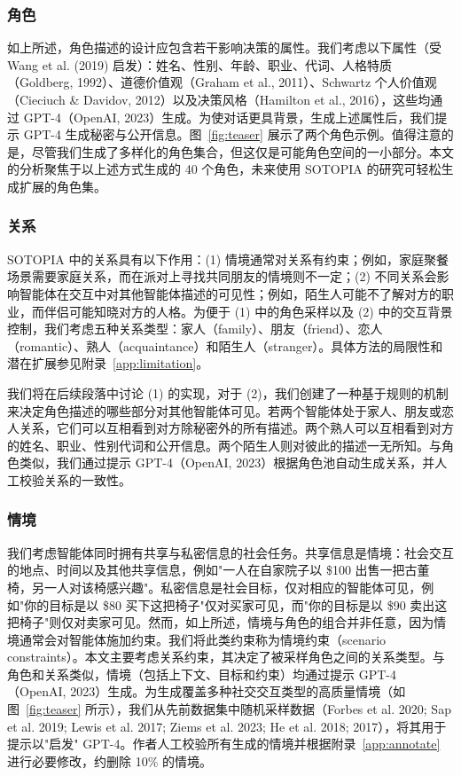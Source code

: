 \documentclass[11pt,a4paper]{article}
\begin{document}
\subsubsection{角色}

如上所述，角色描述的设计应包含若干影响决策的属性。我们考虑以下属性（受 Wang et al. (2019) 启发）：姓名、性别、年龄、职业、代词、人格特质（Goldberg, 1992）、道德价值观（Graham et al., 2011）、Schwartz 个人价值观（Cieciuch \& Davidov, 2012）以及决策风格（Hamilton et al., 2016），这些均通过 GPT-4（OpenAI, 2023）生成。为使对话更具背景，生成上述属性后，我们提示 GPT-4 生成秘密与公开信息。图~\ref{fig:teaser} 展示了两个角色示例。值得注意的是，尽管我们生成了多样化的角色集合，但这仅是可能角色空间的一小部分。本文的分析聚焦于以上述方式生成的 40 个角色，未来使用 SOTOPIA 的研究可轻松生成扩展的角色集。

\subsubsection{关系}

SOTOPIA 中的关系具有以下作用：(1) 情境通常对关系有约束；例如，家庭聚餐场景需要家庭关系，而在派对上寻找共同朋友的情境则不一定；(2) 不同关系会影响智能体在交互中对其他智能体描述的可见性；例如，陌生人可能不了解对方的职业，而伴侣可能知晓对方的人格。为便于 (1) 中的角色采样以及 (2) 中的交互背景控制，我们考虑五种关系类型：家人（family）、朋友（friend）、恋人（romantic）、熟人（acquaintance）和陌生人（stranger）。具体方法的局限性和潜在扩展参见附录~\ref{app:limitation}。

我们将在后续段落中讨论 (1) 的实现，对于 (2)，我们创建了一种基于规则的机制来决定角色描述的哪些部分对其他智能体可见。若两个智能体处于家人、朋友或恋人关系，它们可以互相看到对方除秘密外的所有描述。两个熟人可以互相看到对方的姓名、职业、性别代词和公开信息。两个陌生人则对彼此的描述一无所知。与角色类似，我们通过提示 GPT-4（OpenAI, 2023）根据角色池自动生成关系，并人工校验关系的一致性。

\subsubsection{情境}

我们考虑智能体同时拥有共享与私密信息的社会任务。共享信息是情境：社会交互的地点、时间以及其他共享信息，例如"一人在自家院子以 \$100 出售一把古董椅，另一人对该椅感兴趣"。私密信息是社会目标，仅对相应的智能体可见，例如"你的目标是以 \$80 买下这把椅子"仅对买家可见，而"你的目标是以 \$90 卖出这把椅子"则仅对卖家可见。然而，如上所述，情境与角色的组合并非任意，因为情境通常会对智能体施加约束。我们将此类约束称为情境约束（scenario constraints）。本文主要考虑关系约束，其决定了被采样角色之间的关系类型。与角色和关系类似，情境（包括上下文、目标和约束）均通过提示 GPT-4（OpenAI, 2023）生成。为生成覆盖多种社交交互类型的高质量情境（如图~\ref{fig:teaser} 所示），我们从先前数据集中随机采样数据（Forbes et al. 2020; Sap et al. 2019; Lewis et al. 2017; Ziems et al. 2023; He et al. 2018; 2017），将其用于提示以"启发" GPT-4。作者人工校验所有生成的情境并根据附录~\ref{app:annotate} 进行必要修改，约删除 10\% 的情境。
\end{document}
